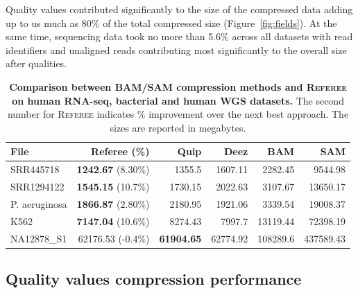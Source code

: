 \documentclass[12pt]{cmuthesis}
\newcommand{\refer}{\textsc{Referee}\xspace}
\begin{document}
  Quality values contributed significantly to the size of the compressed data adding up to us much as 80\% of the total compressed size (Figure~\ref{fig:fields}). At the same time, sequencing data took no more than 5.6\% across all datasets with read identifiers and unaligned reads contributing most significantly to the overall size after qualities.



  \begin{table}[ht!]
    \caption{\textbf{Comparison between BAM/SAM compression methods and \refer on human RNA-seq, bacterial and human WGS datasets.} The second number for \refer indicates \% improvement over the next best approach. The sizes are reported in megabytes.}
    \label{tab:compression}
    \centering
    \begin{tabular}{l r r r r r}
    \toprule %
    File    		& Referee (\%) & Quip 			& Deez 		& BAM  & SAM \\
    \midrule
    SRR445718       & \textbf{1242.67} (8.30\%) & 1355.5 & 1607.11 & 2282.45 & 9544.98 \\
    SRR1294122      & \textbf{1545.15} (10.7\%) & 1730.15 & 2022.63 & 3107.67 & 13650.17 \\
    P. aeruginosa   & \textbf{1866.87} (2.80\%) & 2180.95 & 1921.06 & 3339.54 & 19008.37 \\
    K562    & \textbf{7147.04} (10.6\%) & 8274.43 & 7997.7 & 13119.44 & 72398.19 \\
    NA12878\_S1     & 62176.53 (-0.4\%) & \textbf{61904.65}  & 62774.92 & 108289.6 & 437589.43 \\
    \bottomrule
    \end{tabular}
  \end{table}


  \subsection{Quality values compression performance}

\end{document}
